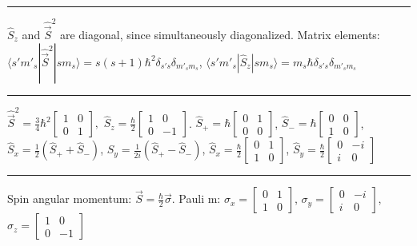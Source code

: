 
\hrule height 0.05pt

$\widehat{S}_z$ and $\widehat{\vec{S}}^2$ are diagonal, since simultaneously diagonalized. Matrix elements: $\langle s' m'_s | \widehat{\vec{S}}^2 | sm_s \rangle = s(s+1) \hbar^2 \delta_{s' s} \delta_{m'_s m_s}$, $\langle s' m'_s | \widehat{S}_z | sm_s \rangle = m_s \hbar \delta_{s' s} \delta_{m'_s m_s}$

\hrule height 0.05pt

\tiny
$\widehat{\vec{S}}^2 = \frac{3}{4} \hbar^2 \begin{bmatrix} 1 & 0 \\ 0 & 1 \end{bmatrix},$
$\widehat{S}_z = \frac{\hbar}{2} \begin{bmatrix} 1 & 0 \\ 0 & -1 \end{bmatrix}$.
$\widehat{S}_{+} = \hbar \begin{bmatrix} 0 & 1 \\ 0 & 0 \end{bmatrix}$,
$\widehat{S}_{-} = \hbar \begin{bmatrix} 0 & 0 \\ 1 & 0 \end{bmatrix}$,
$\widehat{S}_x = \frac{1}{2}(\widehat{S}_{+} + \widehat{S}_{-})$,
$\widehat{S}_y = \frac{1}{2i}(\widehat{S}_{+} - \widehat{S}_{-})$,
$\widehat{S}_x = \frac{\hbar}{2} \begin{bmatrix} 0 & 1 \\ 1 & 0 \end{bmatrix}$,
$\widehat{S}_y = \frac{\hbar}{2} \begin{bmatrix} 0 & -i \\ i & 0 \end{bmatrix}$
\scriptsize

\hrule height 0.05pt

\tiny 
Spin angular momentum: $\vec{S} = \frac{\hbar}{2} \vec{\sigma}$. 
Pauli m: $\sigma_x = \begin{bmatrix} 0 & 1 \\ 1 & 0 \end{bmatrix}$, $\sigma_y = \begin{bmatrix} 0 & -i \\ i & 0 \end{bmatrix}$, $\sigma_z = \begin{bmatrix} 1 & 0 \\ 0 & -1 \end{bmatrix}$
\scriptsize


